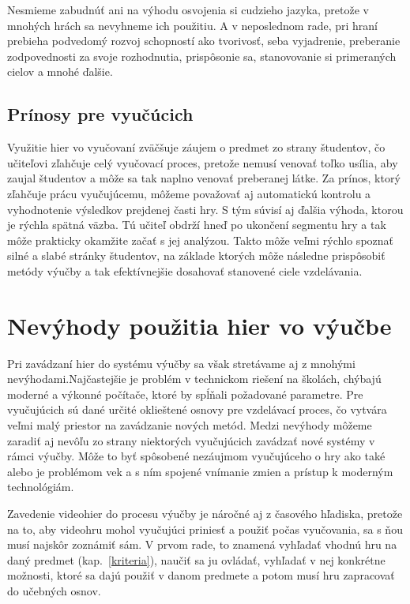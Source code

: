\documentclass[10pt,twoside,slovak,a4paper]{article}
\begin{document}
Nesmieme zabudnúť ani na výhodu osvojenia si cudzieho jazyka, pretože v mnohých hrách sa nevyhneme ich použitiu. A v neposlednom rade, pri hraní prebieha podvedomý rozvoj schopností ako tvorivosť, seba vyjadrenie, preberanie zodpovednosti za svoje rozhodnutia\cite{6185607}, prispôsonie sa, stanovovanie si primeraných cielov a mnohé ďalšie.

\subsection{Prínosy pre vyučúcich} \label{vyhody:vyucujuci}

Využitie hier vo vyučovaní zväčšuje záujem o predmet zo strany študentov\cite{Ucenie}, čo učiteľovi zľahčuje celý vyučovací proces, pretože nemusí venovať toľko usília, aby zaujal študentov a môže sa tak naplno venovať preberanej látke. Za prínos, ktorý zľahčuje prácu vyučujúcemu, môžeme považovať aj automatickú kontrolu a vyhodnotenie výsledkov prejdenej časti hry. S tým súvisí aj ďalšia výhoda, ktorou je rýchla spätná väzba. Tú učiteľ obdrží hneď po ukončení segmentu hry a tak môže prakticky okamžite začať s jej analýzou. Takto môže veľmi rýchlo spoznať silné a slabé stránky študentov, na základe ktorých môže následne prispôsobiť metódy výučby a tak efektívnejšie dosahovať stanovené ciele vzdelávania.

\section{Nevýhody použitia hier vo výučbe} \label{nevyhody}

Pri zavádzaní hier do systému výučby sa však stretávame aj z mnohými nevýhodami.Najčastejšie je problém v technickom riešení na školách, chýbajú moderné a výkonné počítače, ktoré by spĺňali požadované parametre\cite{Videohry}. Pre vyučujúcich sú dané určité oklieštené osnovy pre vzdelávací proces, čo vytvára veľmi malý priestor na zavádzanie nových metód. Medzi nevýhody môžeme zaradiť aj nevôľu zo strany niektorých vyučujúcich zavádzať nové systémy v rámci výučby. Môže to byť spôsobené nezáujmom vyučujúceho o hry ako také alebo je problémom vek a s ním spojené vnímanie zmien a prístup k moderným technológiám.

Zavedenie videohier do procesu výučby je náročné aj z časového hľadiska, pretože na to, aby videohru mohol vyučujúci priniesť a použiť počas vyučovania, sa s ňou musí najskôr zoznámiť sám. V prvom rade, to znamená vyhľadať vhodnú hru na daný predmet (kap.~\ref{kriteria}), naučiť sa ju ovládať, vyhľadať v nej konkrétne možnosti, ktoré sa dajú použiť v danom predmete a potom musí hru zapracovať do učebných osnov.
\end{document}
